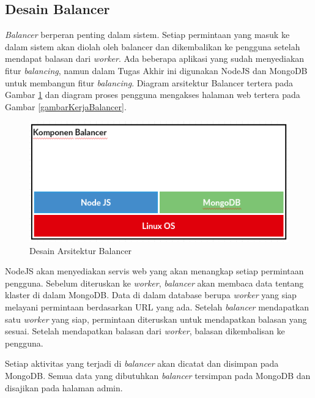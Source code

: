 \documentclass{ta-its}
\begin{document}
			    
			    
			
			\subsection{Desain Balancer}
			    \textit{Balancer} berperan penting dalam sistem. Setiap permintaan yang masuk ke dalam sistem akan diolah oleh balancer dan dikembalikan ke pengguna setelah mendapat balasan dari \textit{worker}. Ada beberapa aplikasi yang sudah menyediakan fitur \textit{balancing}, namun dalam Tugas Akhir ini digunakan NodeJS dan MongoDB untuk membangun fitur \textit{balancing}. Diagram arsitektur Balancer tertera pada Gambar \ref{gambarArsitekturBalancer} dan diagram proses pengguna mengakses halaman web tertera pada Gambar \ref{gambarKerjaBalancer}. 
			    
			    \begin{figure}[] %
			    	\centering
			    	\includegraphics[width=\linewidth]{contoh_img/kompbalancer}
			    	\caption{Desain Arsitektur Balancer}
			    	\label{gambarArsitekturBalancer}
			    \end{figure}
			    
			    NodeJS akan menyediakan servis web yang akan menangkap setiap permintaan pengguna. Sebelum diteruskan ke \textit{worker}, \textit{balancer} akan membaca data tentang klaster di dalam MongoDB. Data di dalam database berupa \textit{worker} yang siap melayani permintaan berdasarkan URL yang ada. Setelah \textit{balancer} mendapatkan satu \textit{worker} yang siap, permintaan diteruskan untuk mendapatkan balasan yang sesuai. Setelah mendapatkan balasan dari \textit{worker}, balasan dikembalisan ke pengguna.
			    
			    Setiap aktivitas yang terjadi di \textit{balancer} akan dicatat dan disimpan pada MongoDB. Semua data yang dibutuhkan \textit{balancer} tersimpan pada MongoDB dan disajikan pada halaman admin.
			    			    
\end{document}
